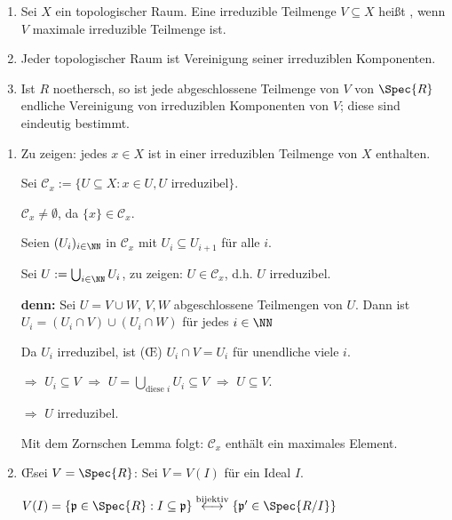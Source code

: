 \begin{DefProp}
\begin{enumerate}
\item Sei $X$ ein topologischer Raum. Eine irreduzible Teilmenge $V \subseteq X$ hei\ss t , wenn $V$ maximale irreduzible Teilmenge ist.

\item Jeder topologischer Raum ist Vereinigung seiner irreduziblen Komponenten.

\item Ist $R$ noethersch, so ist jede abgeschlossene Teilmenge von $V$ von $\Spec{R}$ endliche Vereinigung von irreduziblen Komponenten von $V$; diese sind eindeutig bestimmt.

\end{enumerate}

\begin{Bew}
\begin{enumerate}

\item Zu zeigen: jedes $x \in X$ ist in einer irreduziblen Teilmenge von $X$ enthalten.

Sei $\mathcal{C}_x := \{ U \subseteq X : x \in U, U \text{ irreduzibel} \}$.

$\mathcal{C}_x \neq \emptyset$, da $\{ x \} \in \mathcal{C}_x$.

Seien $(U_i)_{i \in \NN}$ in $\mathcal{C}_x$ mit $U_i \subseteq U_{i+1}$ f\"ur alle $i$.

Sei $U := \bigcup_{i \in \NN} U_i$, zu zeigen: $U \in \mathcal{C}_x$, d.h. $U$ irreduzibel.

\textbf{denn:} Sei $U = V \cup W$, $V,W$ abgeschlossene Teilmengen von $U$. Dann ist $U_i = (U_i \cap V) \cup (U_i \cap W)$ f\"ur jedes $i \in \NN$

Da $U_i$ irreduzibel, ist (\OE) $U_i \cap V = U_i$ f\"ur unendliche viele $i$.

$\Rightarrow$ $U_i \subseteq V$ $\Rightarrow$ $U = \bigcup_{\text{diese }i} U_i \subseteq V$ $\Rightarrow$ $U \subseteq V$.

$\Rightarrow$ $U$ irreduzibel.

Mit dem Zornschen Lemma folgt: $\mathcal{C}_x$ enth\"alt ein maximales Element.

\item \OE  sei $V = \Spec{R}$: Sei $V = V(I)$ f\"ur ein Ideal $I$.

$V(I) = \{ \mathfrak{p} \in \Spec{R} : I \subseteq \mathfrak{p} \} \overset{\text{bijektiv}}\longleftrightarrow \{ \mathfrak{p'} \in \Spec{R/I} \}$


\end{enumerate}
\end{Bew}
\end{DefProp}
